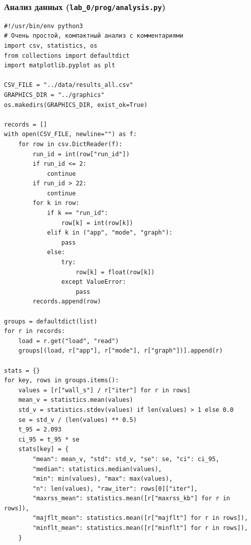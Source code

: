 \documentclass[12pt,a4paper]{article}
\begin{document}
\subsubsection*{Анализ данных (\texttt{lab_0/prog/analysis.py})}
\begin{verbatim}
#!/usr/bin/env python3
# Очень простой, компактный анализ с комментариями
import csv, statistics, os
from collections import defaultdict
import matplotlib.pyplot as plt

CSV_FILE = "../data/results_all.csv"
GRAPHICS_DIR = "../graphics"
os.makedirs(GRAPHICS_DIR, exist_ok=True)

records = []
with open(CSV_FILE, newline="") as f:
    for row in csv.DictReader(f):
        run_id = int(row["run_id"])
        if run_id <= 2:
            continue
        if run_id > 22:
            continue
        for k in row:
            if k == "run_id":
                row[k] = int(row[k])
            elif k in ("app", "mode", "graph"):
                pass
            else:
                try:
                    row[k] = float(row[k])
                except ValueError:
                    pass
        records.append(row)

groups = defaultdict(list)
for r in records:
    load = r.get("load", "read")
    groups[(load, r["app"], r["mode"], r["graph"])].append(r)

stats = {}
for key, rows in groups.items():
    values = [r["wall_s"] / r["iter"] for r in rows]
    mean_v = statistics.mean(values)
    std_v = statistics.stdev(values) if len(values) > 1 else 0.0
    se = std_v / (len(values) ** 0.5)
    t_95 = 2.093
    ci_95 = t_95 * se
    stats[key] = {
        "mean": mean_v, "std": std_v, "se": se, "ci": ci_95,
        "median": statistics.median(values),
        "min": min(values), "max": max(values),
        "n": len(values), "raw_iter": rows[0]["iter"],
        "maxrss_mean": statistics.mean([r["maxrss_kb"] for r in rows]),
        "majflt_mean": statistics.mean([r["majflt"] for r in rows]),
        "minflt_mean": statistics.mean([r["minflt"] for r in rows]),
    }


\end{verbatim}
\end{document}
